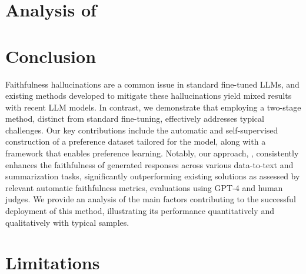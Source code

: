 \documentclass{article} %
\begin{document}
\section{Analysis of \scope}
\label{sec:analysis}


\section{Conclusion}


Faithfulness hallucinations are a common issue in standard fine-tuned LLMs, and existing methods developed to mitigate these hallucinations yield mixed results with recent LLM models. In contrast, we demonstrate that employing a two-stage method, distinct from standard fine-tuning, effectively addresses typical challenges. Our key contributions include the automatic and self-supervised construction of a preference dataset tailored for the model, along with a framework that enables preference learning. Notably, our approach, \scope, consistently enhances the faithfulness of generated responses across various data-to-text and summarization tasks, significantly outperforming existing solutions as assessed by relevant automatic faithfulness metrics, evaluations using GPT-4 and human judges. We provide an analysis of the main factors contributing to the successful deployment of this method, illustrating its performance quantitatively and qualitatively with typical samples.


\section{Limitations}
\label{sec:limitations}

\end{document}
